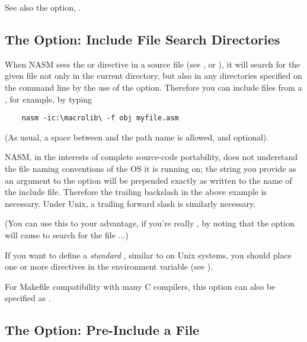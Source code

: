See also the  option, .

\subsection{The  Option: Include File Search Directories}
\label{subsec:opt-i}

When NASM sees the  or  directive
in a source file (see ,  or
), it will search for the given file not only in the
current directory, but also in any directories specified on the command
line by the use of the  option. Therefore you can include files
from a , for example, by typing

\begin{lstlisting}
	nasm -ic:\macrolib\ -f obj myfile.asm
\end{lstlisting}

(As usual, a space between  and the path name is allowed, and
optional).

NASM, in the interests of complete source-code portability, does not
understand the file naming conventions of the OS it is running on;
the string you provide as an argument to the  option will be
prepended exactly as written to the name of the include file.
Therefore the trailing backslash in the above example is necessary.
Under Unix, a trailing forward slash is similarly necessary.

(You can use this to your advantage, if you're really ,
by noting that the option  will cause 
to search for the file ...)

If you want to define a \emph{standard} ,
similar to  on Unix systems, you should place one or
more  directives in the  environment variable (see
).

For Makefile compatibility with many C compilers, this option can also
be specified as .

\subsection{The  Option: Pre-Include a File}
\label{subsec:opt-p}

